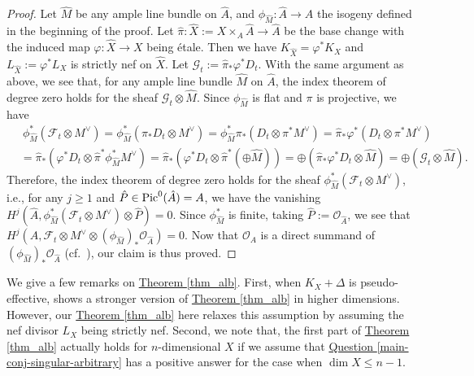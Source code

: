 \begin{proof}
Let $\hat{M}$ be any ample line bundle on $\hat{A}$, and $\phi_{\hat{M}}:\hat{A}\to A$  the isogeny defined  in the beginning of the proof. 
Let $\hat{\pi}:\hat{X}:=X\times_A\hat{A}\to \hat{A}$ be the base change with the induced map $\varphi:\hat{X}\to X$ being \'etale.
Then we have $K_{\hat{X}}=\varphi^*K_X$ and $L_{\hat{X}}:=\varphi^*L_X$ is strictly nef on $\hat{X}$.
Let $\mathcal{G}_t:=\hat{\pi}_*\varphi^*D_t$.
With the same argument as above, we see that, for any ample line bundle $\hat{M}$ on $\hat{A}$, the index theorem of degree zero holds for the sheaf $\mathcal{G}_t\otimes\hat{M}$. 
Since $\phi_{\hat{M}}$ is flat and $\pi$ is projective, we have
\begin{align*}
&~\phi_{\hat{M}}^*(\mathcal{F}_t\otimes M^{\vee})=\phi_{\hat{M}}^*(\pi_*D_t\otimes M^{\vee})=\phi_{\hat{M}}^*\pi_*(D_t\otimes \pi^*M^{\vee})=\hat{\pi}_*\varphi^*(D_t\otimes \pi^*M^{\vee})\\
&=\hat{\pi}_*(\varphi^*D_t\otimes\hat{\pi}^*\phi_{\hat{M}}^*M^{\vee})=\hat{\pi}_*(\varphi^*D_t\otimes\hat{\pi}^*(\oplus \hat{M}))=\oplus(\hat{\pi}_*\varphi^*D_t\otimes\hat{M})=\oplus(\mathcal{G}_t\otimes\hat{M}).
\end{align*}
Therefore, the index theorem of degree zero holds for the sheaf $\phi_{\hat{M}}^*(\mathcal{F}_t\otimes M^{\vee})$, i.e., for any $j\ge 1$ and $\hat{P}\in\textup{Pic}^0(\hat{A})=A$, 
we have the vanishing $H^j(\hat{A},\phi_{\hat{M}}^*(\mathcal{F}_t\otimes M^{\vee})\otimes\hat{P})=0$. 
Since $\phi_{\hat{M}}^*$ is finite, taking $\hat{P}:=\mathcal{O}_{\hat{A}}$, we see that $H^j(A,\mathcal{F}_t\otimes M^{\vee}\otimes (\phi_{\hat{M}})_*\mathcal{O}_{\hat{A}})=0$.
Now that $\mathcal{O}_A$ is a direct summand of $(\phi_{\hat{M}})_*\mathcal{O}_{\hat{A}}$ (cf.~\cite[Proposition 5.7]{KM98}),  our claim is thus  proved.
\end{proof}

We give a few remarks on {\hyperref[thm_alb]{Theorem   \ref*{thm_alb}}}.
First,  when $K_X+\Delta$ is pseudo-effective, \cite[Theorem 8.1]{LP20B} shows a stronger version of {\hyperref[thm_alb]{Theorem   \ref*{thm_alb}}} in higher dimensions. 
However, our {\hyperref[thm_alb]{Theorem   \ref*{thm_alb}}} here relaxes this assumption by assuming the nef divisor $L_X$ being strictly nef. 
Second, we note that, the first part of  {\hyperref[thm_alb]{Theorem   \ref*{thm_alb}}} actually holds for $n$-dimensional $X$ if we assume that  {\hyperref[main-conj-singular-arbitrary]{Question  \ref*{main-conj-singular-arbitrary}}} has a positive answer for the case when $\dim X\leqslant n-1$.


